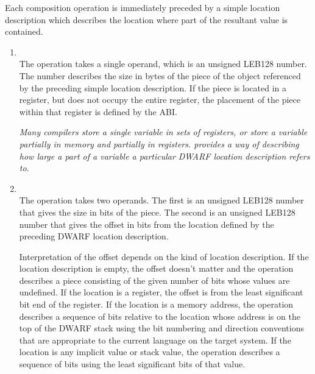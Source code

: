 Each composition operation is immediately preceded by a simple
location description which describes the location where part
of the resultant value is contained.

\begin{enumerate}[1]
\item {} \\
The  operation takes a 
single operand, which is an
unsigned LEB128 number.  The number describes the size in bytes
of the piece of the object referenced by the preceding simple
location description. If the piece is located in a register,
but does not occupy the entire register, the placement of
the piece within that register is defined by the ABI.

\textit{Many compilers store a single variable in sets of registers,
or store a variable partially in memory and partially in
registers.  provides a way of describing how large
a part of a variable a particular DWARF location description
refers to. }

\item {} \\
The  operation takes two operands. The first
is an unsigned LEB128 number that gives the size in bits
of the piece. The second is an unsigned LEB128 number that
gives the offset in bits from the location defined by the
preceding DWARF location description.  

Interpretation of the
offset depends on the kind of location description. If the
location description is empty, the offset doesn’t matter and
the  operation describes a piece consisting
of the given number of bits whose values are undefined. If
the location is a register, the offset is from the least
significant bit end of the register. If the location is a
memory address, the  operation describes a
sequence of bits relative to the location whose address is
on the top of the DWARF stack using the bit numbering and
direction conventions that are appropriate to the current
language on the target system. If the location is any implicit
value or stack value, the  operation describes
a sequence of bits using the least significant bits of that
value.  
\end{enumerate}

